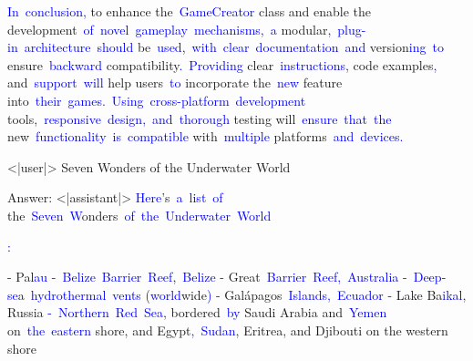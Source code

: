 \documentclass{article}
\begin{document}
\begin{tcolorbox}[colframe=black,colback=white]
{}\textcolor{blue}{In}\textcolor{blue}{~conclusion}\textcolor{blue}{,} to enhance the\textcolor{blue}{~Game}\textcolor{blue}{Creator} class and enable the development\textcolor{blue}{~of}\textcolor{blue}{~novel}\textcolor{blue}{~gameplay}\textcolor{blue}{~mechanisms}\textcolor{blue}{,}\textcolor{blue}{~a} modular\textcolor{blue}{,}\textcolor{blue}{~plug}\textcolor{blue}{-in}\textcolor{blue}{~architecture}\textcolor{blue}{~should} be\textcolor{blue}{~used},\textcolor{blue}{~with}\textcolor{blue}{~clear}\textcolor{blue}{~documentation}\textcolor{blue}{~and} version\textcolor{blue}{ing}\textcolor{blue}{~to} ensure\textcolor{blue}{~backward} compatibility\textcolor{blue}{.}\textcolor{blue}{~Providing} clear\textcolor{blue}{~instructions}, code examples\textcolor{blue}{,} and\textcolor{blue}{~support}\textcolor{blue}{~will} help users\textcolor{blue}{~to} incorporate the\textcolor{blue}{~new} feature into\textcolor{blue}{~their}\textcolor{blue}{~games}\textcolor{blue}{.}\textcolor{blue}{~Using}\textcolor{blue}{~cross}\textcolor{blue}{-platform}\textcolor{blue}{~development} tools,\textcolor{blue}{~responsive}\textcolor{blue}{~design}\textcolor{blue}{,}\textcolor{blue}{~and}\textcolor{blue}{~thorough} testing will\textcolor{blue}{~ensure}\textcolor{blue}{~that}\textcolor{blue}{~the} new\textcolor{blue}{~functionality}\textcolor{blue}{~is}\textcolor{blue}{~compatible} with\textcolor{blue}{~multiple} platforms\textcolor{blue}{~and}\textcolor{blue}{~devices}\textcolor{blue}{.}\textcolor{blue}{}
\end{tcolorbox}


\begin{tcolorbox}[colframe=black,colback=white]
<|user|>
Seven Wonders of the Underwater World

Answer:
<|assistant|>
\textcolor{blue}{Here}'s\textcolor{blue}{~a}\textcolor{blue}{~list}\textcolor{blue}{~of} the\textcolor{blue}{~Seven}\textcolor{blue}{~W}onders\textcolor{blue}{~of}\textcolor{blue}{~the}\textcolor{blue}{~Under}\textcolor{blue}{water}\textcolor{blue}{~World}\textcolor{blue}{:

}- Pal\textcolor{blue}{au}\textcolor{blue}{
}\textcolor{blue}{-}\textcolor{blue}{~Belize}\textcolor{blue}{~Barrier}\textcolor{blue}{~Reef},\textcolor{blue}{~Belize}\textcolor{blue}{
}\textcolor{blue}{-} Great\textcolor{blue}{~Barrier}\textcolor{blue}{~Reef}\textcolor{blue}{,}\textcolor{blue}{~Australia}\textcolor{blue}{
}\textcolor{blue}{-}\textcolor{blue}{~Deep}\textcolor{blue}{-se}a\textcolor{blue}{~hydro}\textcolor{blue}{thermal}\textcolor{blue}{~vents} (\textcolor{blue}{world}wide\textcolor{blue}{)
}\textcolor{blue}{-} Galápagos\textcolor{blue}{~Islands}\textcolor{blue}{,}\textcolor{blue}{~Ecuador}\textcolor{blue}{
}\textcolor{blue}{-} Lake Ba\textcolor{blue}{ikal}, Russia\textcolor{blue}{
}\textcolor{blue}{-}\textcolor{blue}{~Northern}\textcolor{blue}{~Red}\textcolor{blue}{~Sea}, bordered\textcolor{blue}{~by} Saudi Arabia and\textcolor{blue}{~Yemen} on\textcolor{blue}{~the}\textcolor{blue}{~eastern} shore, and Egypt\textcolor{blue}{,}\textcolor{blue}{~Sudan}, Eritrea, and Djibouti on the western shore\textcolor{blue}{}
\end{tcolorbox}
\end{document}
